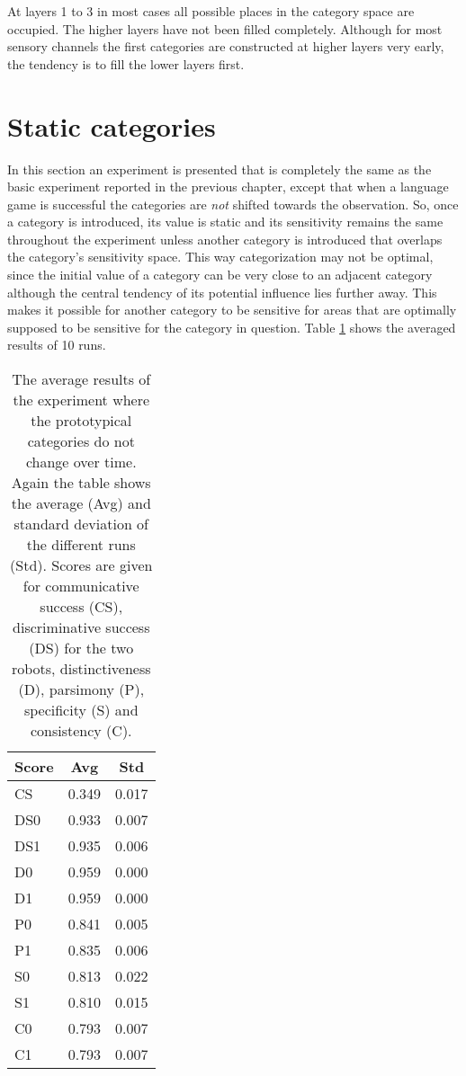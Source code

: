At layers 1 to 3 in most cases all possible places in the category space are occupied. The higher layers have not been filled completely. Although for most sensory channels the first categories are constructed at higher layers very early, the tendency is to fill the lower layers first.

\section{Static categories}\label{s:cat:noshift}

In this section an experiment is presented that is completely the same as the basic experiment reported in the previous chapter, except that when a language game is successful the categories are {\em not} shifted towards the observation. So, once a category is introduced, its value is static and its sensitivity remains the same throughout the experiment unless another category is introduced that overlaps the category's sensitivity space. This way categorization may not be optimal, since the initial value of a category can be very close to an adjacent category although the central tendency of its potential influence lies further away. This makes it possible for another category to be sensitive for areas that are optimally supposed to be sensitive for the category in question. Table \ref{t:cat:avg-ns} shows the averaged results of 10 runs.

\begin{table}
\centering
\begin{tabular}{||l|c|c||}
\hline\hline
Score & Avg & Std\\\hline
CS & 0.349 & 0.017\\\hline
DS0 & 0.933 & 0.007\\\hline
DS1 & 0.935 & 0.006\\\hline
D0 & 0.959 & 0.000\\\hline
D1 & 0.959 & 0.000\\\hline
P0 & 0.841 & 0.005\\\hline
P1 & 0.835 & 0.006\\\hline
S0 & 0.813 & 0.022\\\hline
S1 & 0.810 & 0.015\\\hline
C0 & 0.793 & 0.007\\\hline
C1 & 0.793 & 0.007\\\hline
\hline
\end{tabular}
\caption{The average results of the experiment where the prototypical categories do not change over time. Again the table shows the average (Avg) and standard deviation of the different runs (Std). Scores are given for communicative success (CS), discriminative success (DS) for the two robots, distinctiveness (D), parsimony (P), specificity (S) and consistency (C).}
\label{t:cat:avg-ns}
\end{table}


